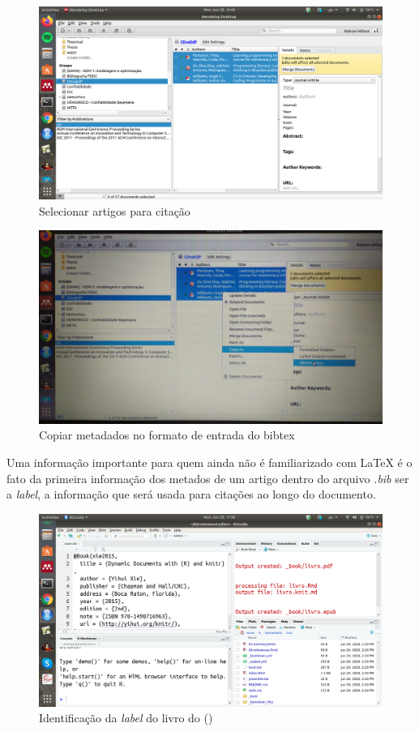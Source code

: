 \documentclass[]{book}
\begin{document}
\begin{figure}
\centering
\includegraphics{fig/mendeley_select_CDnaEP_paper_list.png}
\caption{Selecionar artigos para citação}
\end{figure}

\begin{figure}
\centering
\includegraphics{fig/mendeley_copy_bibtex_entry.jpeg}
\caption{Copiar metadados no formato de entrada do bibtex}
\end{figure}

Uma informação importante para quem ainda não é familiarizado com LaTeX
é o fato da primeira informação dos metados de um artigo dentro do
arquivo \emph{.bib} ser a \emph{label}, a informação que será usada para
citações ao longo do documento.

\begin{figure}
\centering
\includegraphics{fig/rstudio_open_bookbib_first.png}
\caption{Identificação da \emph{label} do livro do (\citep{xie2015})}
\end{figure}
\end{document}
